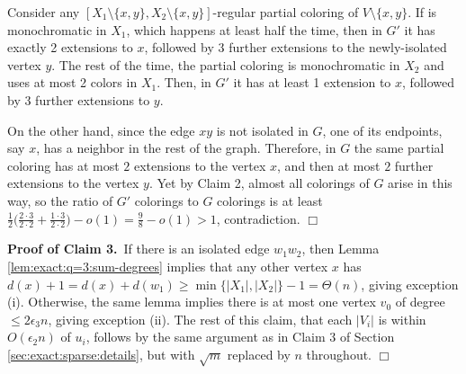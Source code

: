 \documentclass[11pt]{article}
\begin{document}
Consider any $[X_1 \setminus \{x,y\}, X_2 \setminus \{x,y\}]$-regular
partial coloring of $V \setminus \{x,y\}$.  If is monochromatic in
$X_1$, which happens at least half the time, then in $G'$ it has
exactly 2 extensions to $x$, followed by 3 further extensions to the
newly-isolated vertex $y$.  The rest of the time, the partial coloring
is monochromatic in $X_2$ and uses at most 2 colors in $X_1$.  Then,
in $G'$ it has at least 1 extension to $x$, followed by 3 further
extensions to $y$.

On the other hand, since the edge $xy$ is not isolated in $G$, one of its endpoints,
say $x$, has a  neighbor in the rest of the graph. Therefore, in $G$
the same partial coloring has at most $2$ extensions to the vertex $x$,
and then at most $2$ further extensions to the vertex $y$. 
Yet by Claim 2, almost all colorings of $G$
arise in this way, so the ratio of $G'$ colorings to $G$ colorings is
at least $\frac{1}{2} \big(\frac{2 \cdot 3}{2 \cdot 2} + \frac{1 \cdot
  3}{2 \cdot 2}\big) - o(1) = \frac{9}{8} - o(1) > 1$, contradiction.
\hfill $\Box$



\vspace{3mm}



\noindent \textbf{Proof of Claim 3.}\, If there is an isolated edge
$w_1 w_2$, then Lemma \ref{lem:exact:q=3:sum-degrees} implies that any
other vertex $x$ has $d(x) + 1 = d(x) + d(w_1) \geq \min\{|X_1|,
|X_2|\} - 1 = \Theta(n)$, giving exception (i).  Otherwise, the same
lemma implies there is at most one vertex $v_0$ of degree $\leq 2
\epsilon_3 n$, giving exception (ii).  The rest of this claim, that
each $|V_i|$ is within $O(\epsilon_2 n)$ of $u_i$, follows by the same
argument as in Claim 3 of Section \ref{sec:exact:sparse:details}, but
with $\sqrt{m}$ replaced by $n$ throughout.  \hfill $\Box$



\vspace{3mm}
\end{document}

